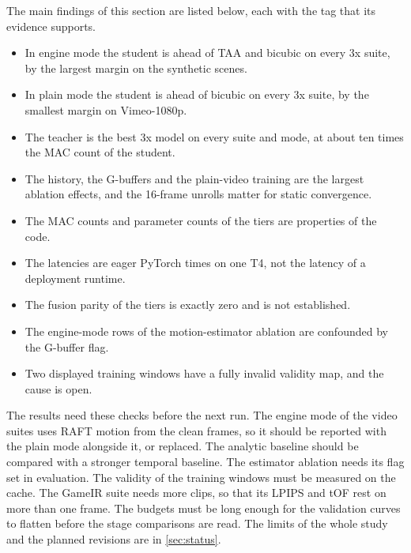 The main findings of this section are listed below, each with the tag that its evidence supports.
\begin{itemize}
\item \Preliminary{} In engine mode the  student is ahead of TAA and bicubic on every 3x suite, by the largest margin on the synthetic scenes.
\item \Preliminary{} In plain mode the  student is ahead of bicubic on every 3x suite, by the smallest margin on Vimeo-1080p.
\item \Preliminary{} The teacher is the best 3x model on every suite and mode, at about ten times the MAC count of the student.
\item \Preliminary{} The history, the G-buffers and the plain-video training are the largest ablation effects, and the 16-frame unrolls matter for static convergence.
\item \Confirmed{} The MAC counts and parameter counts of the tiers are properties of the code.
\item \UnderRevision{} The latencies are eager PyTorch times on one T4, not the latency of a deployment runtime.
\item \UnderRevision{} The fusion parity of the tiers is exactly zero and is not established.
\item \UnderRevision{} The engine-mode rows of the motion-estimator ablation are confounded by the G-buffer flag.
\item \Observation{} Two displayed training windows have a fully invalid validity map, and the cause is open.
\end{itemize}

The results need these checks before the next run. The engine mode of the video suites uses RAFT motion from the clean frames, so it should be reported with the plain mode alongside it, or replaced. The analytic baseline should be compared with a stronger temporal baseline. The estimator ablation needs its flag set in evaluation. The validity of the training windows must be measured on the cache. The GameIR suite needs more clips, so that its LPIPS and tOF rest on more than one frame. The budgets must be long enough for the validation curves to flatten before the stage comparisons are read. The limits of the whole study and the planned revisions are in \cref{sec:status}.
